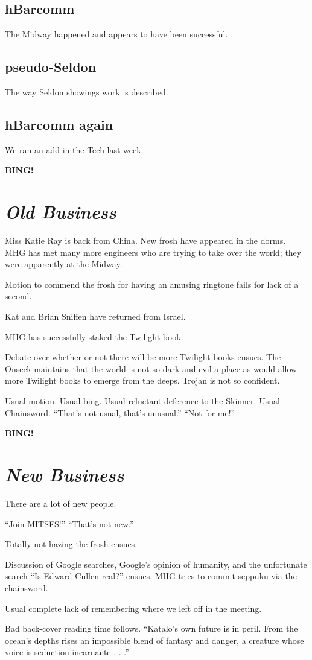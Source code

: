 \documentclass[10pt]{article}
\newcommand{\bing}{{\bf BING!} }
\newcommand{\goto}[1]{\bing \vskip 12pt \section*{{\em{#1}}}}
\begin{document}
\subsection*{hBarcomm}
The Midway happened and appears to have been successful.

\subsection*{pseudo-Seldon}
The way Seldon showings work is described.

\subsection*{hBarcomm again}
We ran an add in the Tech last week.

\goto{Old Business}

Miss Katie Ray is back from China. New frosh have appeared in the dorms. MHG has met many more engineers who are trying to take over the world; they were apparently at the Midway.

Motion to commend the frosh for having an amusing ringtone fails for lack of a second.

Kat and Brian Sniffen have returned from Israel.

MHG has successfully staked the Twilight book.

Debate over whether or not there will be more Twilight books ensues. The Onseck maintains that the world is not so dark and evil a place as would allow more Twilight books to emerge from the deeps. Trojan is not so confident.

Usual motion. Usual bing. Usual reluctant deference to the Skinner. Usual Chainsword. ``That's not usual, that's unusual.'' ``Not for me!''

\goto{New Business}
There are a lot of new people.

``Join MITSFS!'' ``That's not new.''

Totally not hazing the frosh ensues.

Discussion of Google searches, Google's opinion of humanity, and the unfortunate search ``Is Edward Cullen real?'' ensues. MHG tries to commit seppuku via the chainsword.

Usual complete lack of remembering where we left off in the meeting.

Bad back-cover reading time follows. ``Katalo's own future is in peril. From the ocean's depths rises an impossible blend of fantasy and danger, a creature whose voice is seduction incarnante . . .'' 
\end{document}

